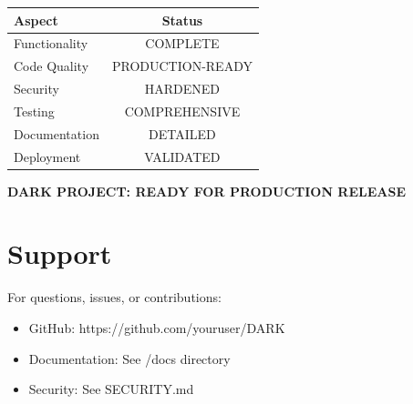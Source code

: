 \documentclass[12pt,a4paper]{report}
\begin{document}
\begin{tabular}{|l|c|}
\hline
\textbf{Aspect} & \textbf{Status} \\
\hline
Functionality & COMPLETE \\
Code Quality & PRODUCTION-READY \\
Security & HARDENED \\
Testing & COMPREHENSIVE \\
Documentation & DETAILED \\
Deployment & VALIDATED \\
\hline
\end{tabular}

\vspace{1cm}
\textbf{DARK PROJECT: READY FOR PRODUCTION RELEASE}

\section{Support}

For questions, issues, or contributions:
\begin{itemize}
    \item GitHub: https://github.com/youruser/DARK
    \item Documentation: See /docs directory
    \item Security: See SECURITY.md
\end{itemize}
\end{document}
